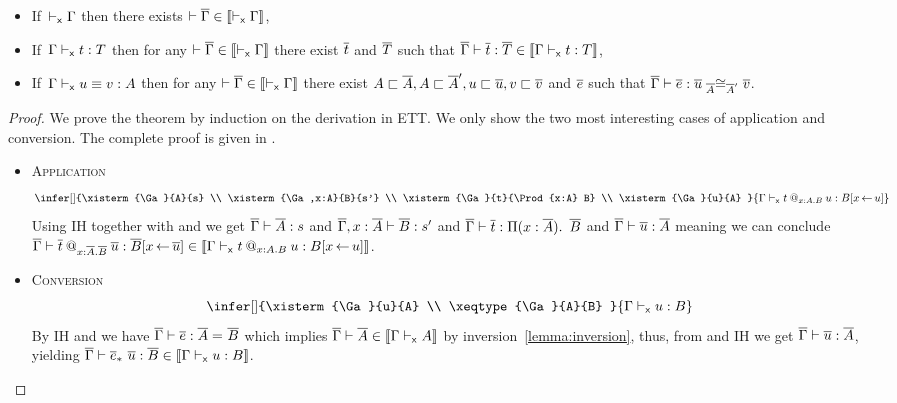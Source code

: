 \begin{theorem}[Translation]
  \leavevmode
  \begin{itemize}
    \item If\,\,\,$\vdash_{\mathsf{x}} \Gamma$ then there exists
    $\vdash \overline{\Gamma} \in \llbracket \vdash_{\mathsf{x}} \Gamma \rrbracket$,

    \item If\,\,\,$\Gamma \vdash_{\mathsf{x}} t : T$ then for any
    $\vdash \overline{\Gamma} \in \llbracket \vdash_{\mathsf{x}} \Gamma \rrbracket$ there exist $\overline{t}$ and $\overline{T}$ such
    that $\overline{\Gamma} \vdash \overline{t} : \overline{T} \in \llbracket \Gamma \vdash_{\mathsf{x}} t : T \rrbracket$,

    \item If\,\,\,$\Gamma \vdash_{\mathsf{x}} u \equiv v : A$ then for any
    $\vdash \overline{\Gamma} \in \llbracket \vdash_{\mathsf{x}} \Gamma \rrbracket$ there exist
    $A \sqsubset \overline{A}, A \sqsubset \overline{A}', u \sqsubset \overline{u}, v \sqsubset \overline{v}$ and $\overline{e}$ such that
    $\overline{\Gamma} \vdash \overline{e} : \overline{u} \mathrel{{}_{\overline{A}}{\cong}_{\overline{A}'}} \overline{v}$.
  \end{itemize}
\end{theorem}

\begin{proof}
  We prove the theorem by induction on the derivation in \acrshort{ETT}.
  We only show the two most interesting cases of application and conversion.
  The complete proof is given in .

  \begin{itemize}
    \item \textsc{Application}
    \[
      \infer[]
        {\xisterm{\Ga}{A}{s} \\
         \xisterm{\Ga,x:A}{B}{s'} \\
         \xisterm{\Ga}{t}{\Prod{x:A} B} \\
         \xisterm{\Ga}{u}{A}
        }
        {\xisterm{\Ga}{\app{t}{x:A}{B}{u}}{B[x \sto u]}}
    \]
    Using IH together with  and 
    we get $\overline{\Gamma} \vdash \overline{A} : s$ and $\overline{\Gamma},x:\overline{A} \vdash \overline{B} : s'$ and
    $\overline{\Gamma} \vdash \overline{t} : \mathop{\Pi(x:\overline{A}).\ } \overline{B}$ and $\overline{\Gamma} \vdash \overline{u} : \overline{A}$
    meaning we can conclude
    $\overline{\Gamma} \vdash \overline{t}\mathbin{@_{x:\overline{A}.\overline{B}}} \overline{u} : \overline{B}[x \mathop{\leftarrow} \overline{u}]
    \in \llbracket \Gamma \vdash_{\mathsf{x}} t\mathbin{@_{x:A.B}} u : B[x \mathop{\leftarrow} u] \rrbracket$.

    \item \textsc{Conversion}
    \[
      \infer[]
        {\xisterm{\Ga}{u}{A} \\
         \xeqtype{\Ga}{A}{B}
        }
        {\xisterm{\Ga}{u}{B}}
    \]
    By IH and  we have
    $\overline{\Gamma} \vdash \overline{e} : \overline{A} =_{} \overline{B}$ which implies
    $\overline{\Gamma} \vdash \overline{A} \in \llbracket \Gamma \vdash_{\mathsf{x}} A \rrbracket$ by
    inversion~\eqref{lemma:inversion}, thus, from 
    and IH we get $\overline{\Gamma} \vdash \overline{u} : \overline{A}$, yielding
    $\overline{\Gamma} \vdash \overline{e}_*\ \overline{u} : \overline{B} \in \llbracket \Gamma \vdash_{\mathsf{x}} u : B \rrbracket$.
  \end{itemize}

\end{proof}


